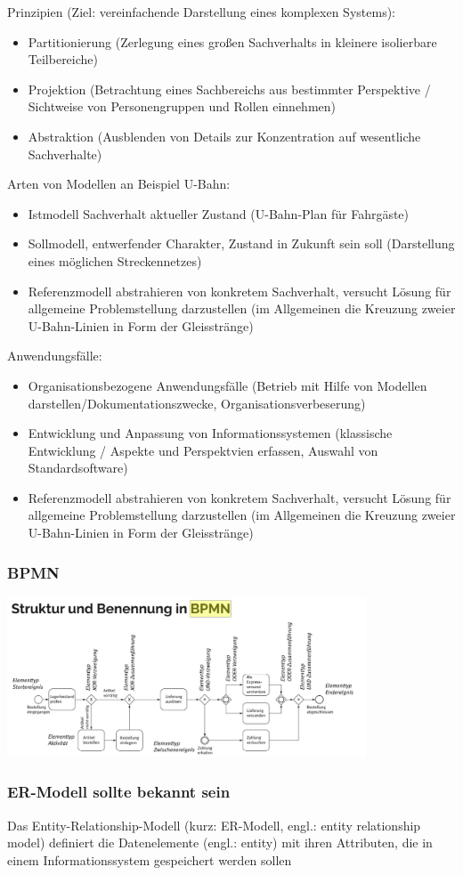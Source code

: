 Prinzipien (Ziel: vereinfachende Darstellung eines komplexen Systems):
\begin{itemize}
 \item Partitionierung (Zerlegung eines großen Sachverhalts in kleinere isolierbare Teilbereiche)
 \item Projektion (Betrachtung eines Sachbereichs aus bestimmter Perspektive / Sichtweise von Personengruppen und Rollen einnehmen)
 \item Abstraktion (Ausblenden von Details zur Konzentration auf wesentliche Sachverhalte)
\end{itemize}

Arten von Modellen an Beispiel U-Bahn:
\begin{itemize}
 \item Istmodell Sachverhalt aktueller Zustand (U-Bahn-Plan für Fahrgäste)
 \item Sollmodell, entwerfender Charakter, Zustand in Zukunft sein soll (Darstellung eines möglichen Streckennetzes)
 \item Referenzmodell abstrahieren von konkretem Sachverhalt, versucht Lösung für allgemeine Problemstellung darzustellen  (im Allgemeinen die Kreuzung zweier U-Bahn-Linien in Form der Gleisstränge)
\end{itemize}

Anwendungsfälle:
\begin{itemize}
 \item Organisationsbezogene Anwendungsfälle (Betrieb mit Hilfe von Modellen darstellen/Dokumentationszwecke, Organisationsverbeserung)
 \item Entwicklung und Anpassung von Informationssystemen (klassische Entwicklung / Aspekte und Perspektvien erfassen, Auswahl von Standardsoftware)
 \item Referenzmodell abstrahieren von konkretem Sachverhalt, versucht Lösung für allgemeine Problemstellung darzustellen  (im Allgemeinen die Kreuzung zweier U-Bahn-Linien in Form der Gleisstränge)
\end{itemize}
\subsubsection{BPMN}
\includegraphics[width=0.8\textwidth]{assets/BPMN.PNG}
\subsubsection{ER-Modell sollte bekannt sein}
Das Entity-Relationship-Modell (kurz: ER-Modell, engl.: entity relationship model) definiert die Datenelemente (engl.: entity) mit ihren Attributen, die in einem Informationssystem gespeichert werden sollen


